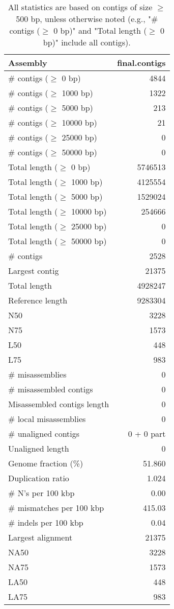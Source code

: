 \documentclass[12pt,a4paper]{article}
\begin{document}
\begin{table}[ht]
\begin{center}
\caption{All statistics are based on contigs of size $\geq$ 500 bp, unless otherwise noted (e.g., "\# contigs ($\geq$ 0 bp)" and "Total length ($\geq$ 0 bp)" include all contigs).}
\begin{tabular}{|l*{1}{|r}|}
\hline
Assembly & final.contigs \\ \hline
\# contigs ($\geq$ 0 bp) & 4844 \\ \hline
\# contigs ($\geq$ 1000 bp) & 1322 \\ \hline
\# contigs ($\geq$ 5000 bp) & 213 \\ \hline
\# contigs ($\geq$ 10000 bp) & 21 \\ \hline
\# contigs ($\geq$ 25000 bp) & 0 \\ \hline
\# contigs ($\geq$ 50000 bp) & 0 \\ \hline
Total length ($\geq$ 0 bp) & 5746513 \\ \hline
Total length ($\geq$ 1000 bp) & 4125554 \\ \hline
Total length ($\geq$ 5000 bp) & 1529024 \\ \hline
Total length ($\geq$ 10000 bp) & 254666 \\ \hline
Total length ($\geq$ 25000 bp) & 0 \\ \hline
Total length ($\geq$ 50000 bp) & 0 \\ \hline
\# contigs & 2528 \\ \hline
Largest contig & 21375 \\ \hline
Total length & 4928247 \\ \hline
Reference length & 9283304 \\ \hline
N50 & 3228 \\ \hline
N75 & 1573 \\ \hline
L50 & 448 \\ \hline
L75 & 983 \\ \hline
\# misassemblies & 0 \\ \hline
\# misassembled contigs & 0 \\ \hline
Misassembled contigs length & 0 \\ \hline
\# local misassemblies & 0 \\ \hline
\# unaligned contigs & 0 + 0 part \\ \hline
Unaligned length & 0 \\ \hline
Genome fraction (\%) & 51.860 \\ \hline
Duplication ratio & 1.024 \\ \hline
\# N's per 100 kbp & 0.00 \\ \hline
\# mismatches per 100 kbp & 415.03 \\ \hline
\# indels per 100 kbp & 0.04 \\ \hline
Largest alignment & 21375 \\ \hline
NA50 & 3228 \\ \hline
NA75 & 1573 \\ \hline
LA50 & 448 \\ \hline
LA75 & 983 \\ \hline
\end{tabular}
\end{center}
\end{table}
\end{document}
